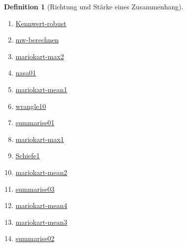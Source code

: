 \documentclass[
  a4paper,
  DIV=11]{scrreprt}
\providecommand{\tightlist}{%
  \setlength{\itemsep}{0pt}\setlength{\parskip}{0pt}}\usepackage{longtable,booktabs,array}
\theoremstyle{definition}
\theoremstyle{definition}
\theoremstyle{definition}
\newtheorem{definition}{Definition}[chapter]
\theoremstyle{remark}
\begin{document}
\begin{definition}[Richtung und Stärke eines
Zusammenhang]
\begin{enumerate}
\def\labelenumi{\arabic{enumi}.}
\tightlist
\item
  \href{https://datenwerk.netlify.app/posts/kennwert-robust/kennwert-robust}{Kennwert-robust}
\item
  \href{https://datenwerk.netlify.app/posts/mw-berechnen/mw-berechnen.html}{mw-berechnen}
\item
  \href{https://datenwerk.netlify.app/posts/mariokart-max2/mariokart-max2.html}{mariokart-max2}
\item
  \href{https://datenwerk.netlify.app/posts/nasa01/nasa01.html}{nasa01}
\item
  \href{https://datenwerk.netlify.app/posts/mariokart-mean1/mariokart-mean1.html}{mariokart-mean1}
\item
  \href{https://datenwerk.netlify.app/posts/wrangle10/wrangle10.html}{wrangle10}
\item
  \href{https://datenwerk.netlify.app/posts/summarise01/summarise01.html}{summarise01}
\item
  \href{https://datenwerk.netlify.app/posts/mariokart-max1/mariokart-max1.html}{mariokart-max1}
\item
  \href{https://datenwerk.netlify.app/posts/schiefe1/schiefe1}{Schiefe1}
\item
  \href{https://datenwerk.netlify.app/posts/mariokart-mean2/mariokart-mean2.html}{mariokart-mean2}
\item
  \href{https://datenwerk.netlify.app/posts/summarise03/summarise03.html}{summarise03}
\item
  \href{https://datenwerk.netlify.app/posts/mariokart-mean4/mariokart-mean4.html}{mariokart-mean4}
\item
  \href{https://datenwerk.netlify.app/posts/mariokart-mean3/mariokart-mean3.html}{mariokart-mean3}
\item
  \href{https://datenwerk.netlify.app/posts/summarise02/summarise02.html}{summarise02}
\end{enumerate}

\begin{tcolorbox}[enhanced jigsaw, leftrule=.75mm, opacitybacktitle=0.6, colback=white, colframe=quarto-callout-tip-color-frame, coltitle=black, colbacktitle=quarto-callout-tip-color!10!white, opacityback=0, left=2mm, breakable, titlerule=0mm, toptitle=1mm, bottomtitle=1mm, rightrule=.15mm, title=\textcolor{quarto-callout-tip-color}{\faLightbulb}\hspace{0.5em}{Tipp}, arc=.35mm, bottomrule=.15mm, toprule=.15mm]


\end{tcolorbox}
\end{definition}
\end{document}
